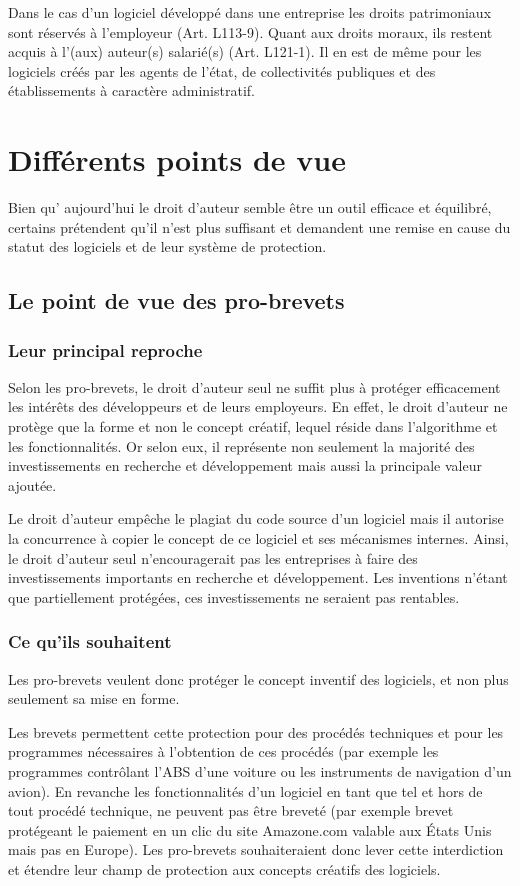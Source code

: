 \documentclass{report}
\begin{document}
Dans le cas d'un logiciel développé dans une entreprise les droits patrimoniaux sont réservés à l'employeur (Art. L113-9). Quant aux droits moraux, ils restent acquis à l'(aux) auteur(s) salarié(s) (Art. L121-1). Il en est de même pour les logiciels créés par les agents de l'état, de collectivités publiques et des établissements à caractère administratif.

\chapter{Différents points de vue}
Bien qu' aujourd'hui le droit d'auteur semble être un outil efficace et équilibré, certains prétendent qu'il n'est plus suffisant et demandent une remise en cause du statut des logiciels et de leur système de protection.

\section{Le point de vue des pro-brevets}

\subsection{Leur principal reproche}
Selon les pro-brevets, le droit d'auteur seul ne suffit plus à protéger efficacement les intérêts des développeurs et de leurs employeurs. En effet, le droit d'auteur ne protège que la forme et non le concept créatif, lequel réside dans l’algorithme et les fonctionnalités. Or selon eux, il représente non seulement la majorité des investissements en recherche et développement mais aussi la principale valeur ajoutée. 

Le droit d'auteur empêche le plagiat du code source d'un logiciel mais il autorise la concurrence à copier le concept de ce logiciel et ses mécanismes internes. Ainsi, le droit d'auteur seul n'encouragerait pas les entreprises à faire des investissements importants en recherche et développement. Les inventions n'étant que partiellement protégées, ces investissements ne seraient pas rentables.

\subsection{Ce qu'ils souhaitent}
Les pro-brevets veulent donc protéger le concept inventif des logiciels, et non plus seulement sa mise en forme.

Les brevets permettent cette protection pour des procédés techniques et pour les programmes nécessaires à l'obtention de ces procédés (par exemple les programmes contrôlant l'ABS d'une voiture ou les instruments de navigation d'un avion). En revanche les fonctionnalités d'un logiciel en tant que tel et hors de tout procédé technique, ne peuvent pas être breveté (par exemple brevet protégeant le paiement en un clic du site Amazone.com valable aux États Unis mais pas en Europe). Les pro-brevets souhaiteraient donc lever cette interdiction et étendre leur champ de protection aux concepts créatifs des logiciels.
\end{document}
